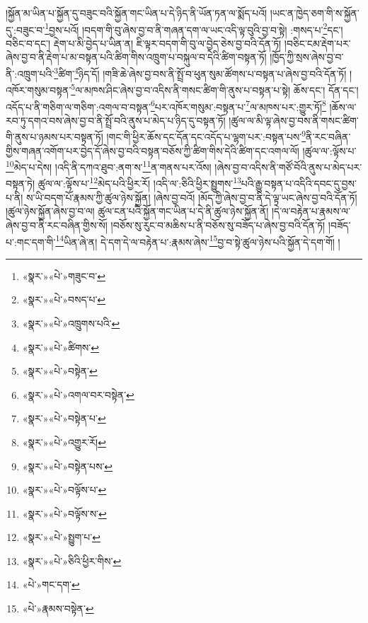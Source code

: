 །སྐྱོན་མ་ཡིན་པ་སྐྱོན་དུ་བཟུང་བའི་སྐྱོན་གང་ཡིན་པ་དེ་ཉིད་ནི་ཡོན་ཏན་ལ་སྨོད་པའོ། །ཡང་ན་ཁྱེད་ཅག་གི་ས་སྐྱོན་དུ་:བཟུང་བ་\footnote{«སྣར་»«པེ་»གཟུང་བ་}བྱས་པའོ། །བདག་གི་བུ་ཞེས་བྱ་བ་ནི་གཞན་དག་ལ་ཡང་འདི་ལྟ་བུའི་བྱ་བ་སྟེ། :གསད་པ་\footnote{«སྣར་»«པེ་»བསད་པ་}དང་། བཅིང་བ་དང་། རྡེག་པ་མི་བྱེད་པ་ཡིན་ན། ཇི་ལྟར་བདག་གི་བུ་ལ་བྱེད་ཅེས་བྱ་བའི་དོན་ཏོ། །བཅིང་ངམ་རྡེག་པར་ཞེས་བྱ་བ་ནི་རྡེག་པ་མ་བསྟན་པའི་ཚིག་གིས་འཁྲུག་པ་བསྐུལ་བ་དེའི་ཚིག་བསྟན་ཏོ། །ཁྱོད་ཀྱི་སྲས་ཞེས་བྱ་བ་ནི་:འཁྲུག་པའི་\footnote{«སྣར་»«པེ་»འཁྲུགས་པའི་}ཚིག་\footnote{«སྣར་»«པེ་»ཚིགས་}ཉིད་དོ། །གཟི་ཆེ་ཞེས་བྱ་བས་ནི་སྤྲོ་བ་ཕུན་སུམ་ཚོགས་པ་བསྟན་པ་ཞེས་བྱ་བའི་དོན་ཏོ། །འཁོར་གསུམ་བསྟན་\footnote{«སྣར་»«པེ་»བསྟེན་}ལ་མཁས་ཤིང་ཞེས་བྱ་བ་འདིས་ནི་གསང་ཚིག་གི་ནུས་པ་བསྟན་པ་སྟེ། ཆོས་དང་། དོན་དང་། འདོད་པ་ནི་གཅིག་ལ་གཅིག་:འགལ་བ་བསྟན་\footnote{«སྣར་»«པེ་»འགལ་བར་བསྟེན་}པར་འཁོར་གསུམ་:བསྟན་པ་\footnote{«སྣར་»«པེ་»བསྟེན་པ་}ལ་མཁས་པར་:གྱུར་ཏོ།\footnote{«སྣར་»«པེ་»འགྱུར་རོ།} །ཆོས་ལ་རབ་ཏུ་དགའ་བས་ཞེས་བྱ་བ་ནི་སྤྲོ་བའི་ནུས་པ་མེད་པ་ཉིད་དུ་བསྟན་ཏོ། །ཚུལ་ལ་མི་ལྟ་ཞེས་བྱ་བས་ནི་གསང་ཚིག་གི་ནུས་པ་ཉམས་པར་བསྟན་ཏོ། །གང་གི་ཕྱིར་ཆོས་དང་དོན་དང་འདོད་པ་ལྷག་པར་:བསྟན་པས་\footnote{«སྣར་»«པེ་»བསྟེན་པས་}ནི་རང་བཞིན་གྱིས་གཞན་འགོག་པར་བྱེད་དོ་ཞེས་བྱ་བའི་བསྟན་བཅོས་ཀྱི་ཚིག་གིས་དེའི་ཚིག་དང་འགལ་ལོ། །ཚུལ་ལ་:ལྟོས་པ་\footnote{«སྣར་»«པེ་»བལྟོས་པ་}མེད་པ་དེས། །འདི་ནི་དཀའ་ཐུབ་:ནག་ས་\footnote{«སྣར་»«པེ་»བལྟོས་ས་}ན་གནས་པར་འོས། །ཞེས་བྱ་བ་འདིས་ནི་གཙོ་བོའི་ནུས་པ་མེད་པར་བསྟན་ཏེ། ཚུལ་ལ་:ལྟོས་པ་\footnote{«སྣར་»«པེ་»སྤྱུག་པ་}མེད་པའི་ཕྱིར་རོ། །འདི་ལ་:ཅིའི་ཕྱིར་སྤྱུགས་\footnote{«སྣར་»«པེ་»ཅིའི་ཕྱིར་གིས་}པའི་རྒྱུ་བསྟན་པ་འདིའི་དབང་དུ་བྱས་པ་ནི། ས་ཡི་བདག་པོ་རྣམས་ཀྱི་ཚུལ་ཉེས་སྐྱོན། །ཞེས་བྱ་བའོ། །མོད་ཀྱི་ཞེས་བྱ་བ་ནི་དེ་ལྟ་ཡང་ཞེས་བྱ་བའི་དོན་ཏོ། །ཚུལ་ཉེས་སྐྱོན་ཞེས་བྱ་བ་ལ། ཚུལ་ངན་པའི་སྐྱོན་གང་ཡིན་པ་དེ་ནི་ཚུལ་ཉེས་སྐྱོན་ནོ། །དེ་ལ་བརྟེན་པ་རྣམས་ལ་ཞེས་བྱ་བ་ནི་རང་བཞིན་གྱིས་སོ། །བཅོས་སུ་རུང་བ་མཆིས་པ་ནི་བཅོས་སུ་བཟོད་པ་ཞེས་བྱ་བའི་དོན་ཏོ། །བཟོད་པ་:གང་དག་གི་\footnote{«པེ་»གང་དག་}ཡིན་ཞེ་ན། དེ་དག་དེ་ལ་བརྟེན་པ་:རྣམས་ཞེས་\footnote{«པེ་»རྣམས་བསྟེན་}བྱ་བ་སྟེ་ཚུལ་ཉེས་པའི་སྐྱོན་དེ་དག་གོ། །
